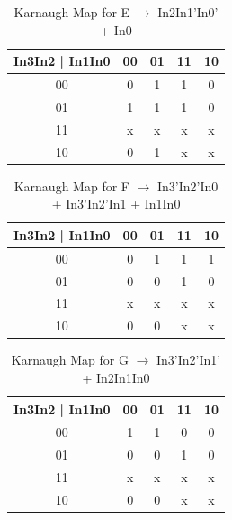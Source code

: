 \documentclass[
	letterpaper, %
	10pt, %
]{CSUniSchoolLabReport}
\begin{document}
    \begin{table}[H]
      \centering
      \begin{tabular}{|c | c | c | c | c |}
        \hline
        In3In2 |  In1In0 & 00 & 01 & 11 & 10\\
        \hline
        00 & 0 & 1 & 1 & 0\\
        \hline
        01 & 1 & 1 & 1 & 0\\
        \hline
        11 & x & x & x & x\\
        \hline
        10 & 0 & 1 & x & x\\
        \hline
      \end{tabular}
      \caption{Karnaugh Map for E $\rightarrow$ In2In1'In0' + In0}
      \label{tab:6}
    \end{table}

    \begin{table}[H]
      \centering
      \begin{tabular}{|c | c | c | c | c |}
        \hline
        In3In2 |  In1In0 & 00 & 01 & 11 & 10\\
        \hline
        00 & 0 & 1 & 1 & 1\\
        \hline
        01 & 0 & 0 & 1 & 0\\
        \hline
        11 & x & x & x & x\\
        \hline
        10 & 0 & 0 & x & x\\
        \hline
      \end{tabular}
      \caption{Karnaugh Map for F $\rightarrow$ In3'In2'In0 + In3'In2'In1 + In1In0}
      \label{tab:7}
    \end{table}

    \begin{table}[H]
      \centering
      \begin{tabular}{|c | c | c | c | c |}
        \hline
        In3In2 |  In1In0 & 00 & 01 & 11 & 10\\
        \hline
        00 & 1 & 1 & 0 & 0\\
        \hline
        01 & 0 & 0 & 1 & 0\\
        \hline
        11 & x & x & x & x\\
        \hline
        10 & 0 & 0 & x & x\\
        \hline
      \end{tabular}
      \caption{Karnaugh Map for G $\rightarrow$ In3'In2'In1' + In2In1In0}
      \label{tab:8}
    \end{table}
\end{document}
